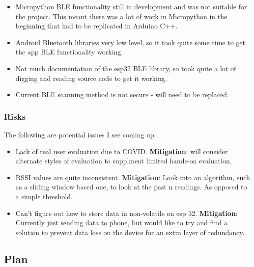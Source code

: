 \documentclass[11pt]{article}
\begin{document}
\begin{itemize}
    \setlength\itemsep{0.1em}
\item Micropython BLE functionality still in development and was not suitable for 
the project. This meant there was a lot of work in Micropython in the beginning that 
had to be replicated in Arduino C++.
\item Android Bluetooth libraries very low level, so it took quite some time to get 
the app BLE functionality working.
\item Not much documentation of the esp32 BLE library, so took quite a lot of digging
and reading source code to get it working.
\item Current BLE scanning method is not secure - will need to be replaced.

\end{itemize}

\subsubsection{Risks}\label{risks}

The following are potential issues I see coming up.

\begin{itemize}
    \setlength\itemsep{0.1em}
\item Lack of real user evaluation due to COVID. \textbf{Mitigation}: will consider 
alternate styles of evaluation to supplment limited hands-on evaluation.
\item RSSI values are quite inconsistent. \textbf{Mitigation}: Look into an 
algorithm, such as a sliding window based one, to look at the past n readings. As 
opposed to a simple threshold.
\item Can't figure out how to store data in non-volatile on esp 32. 
\textbf{Mitigation}: Currently just sending data to phone, but would like to try and 
find a solution to prevent data loss on the device for an extra layer of redundancy.

\end{itemize}

\subsection{Plan}\label{plan}
\end{document}
